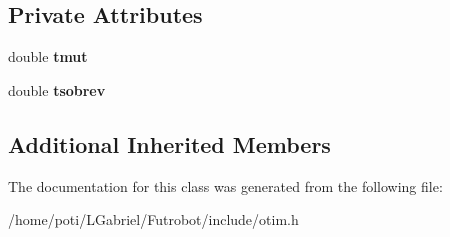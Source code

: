 \subsection*{Private Attributes}
\begin{DoxyCompactItemize}
\item 
double {\bfseries tmut}\hypertarget{classgenetico_a009484c4a247122250fda31e2ad4b7ff}{}\label{classgenetico_a009484c4a247122250fda31e2ad4b7ff}

\item 
double {\bfseries tsobrev}\hypertarget{classgenetico_ad3da38cd6b39bbbf340b9d47f520ac07}{}\label{classgenetico_ad3da38cd6b39bbbf340b9d47f520ac07}

\end{DoxyCompactItemize}
\subsection*{Additional Inherited Members}


The documentation for this class was generated from the following file\+:\begin{DoxyCompactItemize}
\item 
/home/poti/\+L\+Gabriel/\+Futrobot/include/otim.\+h\end{DoxyCompactItemize}
